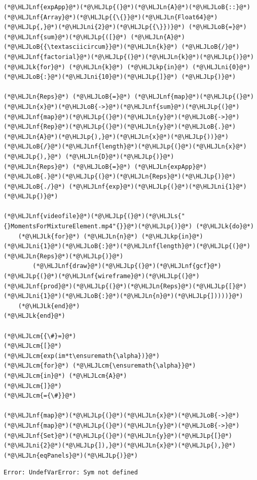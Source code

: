 \documentclass[12pt,a4paper]{article}
\newcommand{\HLJLk}[1]{\textcolor[RGB]{148,91,176}{\textbf{#1}}}
\newcommand{\HLJLkp}[1]{\textcolor[RGB]{148,91,176}{\textbf{#1}}}
\newcommand{\HLJLn}[1]{#1}
\newcommand{\HLJLnf}[1]{\textcolor[RGB]{66,102,213}{#1}}
\newcommand{\HLJLs}[1]{\textcolor[RGB]{201,61,57}{#1}}
\newcommand{\HLJLni}[1]{\textcolor[RGB]{59,151,46}{#1}}
\newcommand{\HLJLoB}[1]{\textcolor[RGB]{102,102,102}{\textbf{#1}}}
\newcommand{\HLJLp}[1]{#1}
\newcommand{\HLJLcm}[1]{\textcolor[RGB]{153,153,119}{\textit{#1}}}
\begin{document}
\begin{lstlisting}
(*@\HLJLnf{expApp}@*)(*@\HLJLp{(}@*)(*@\HLJLn{A}@*)(*@\HLJLoB{::}@*)(*@\HLJLnf{Array}@*)(*@\HLJLp{{\{}}@*)(*@\HLJLn{Float64}@*)(*@\HLJLp{,}@*)(*@\HLJLni{2}@*)(*@\HLJLp{{\}})}@*) (*@\HLJLoB{=}@*) (*@\HLJLnf{sum}@*)(*@\HLJLp{([}@*) (*@\HLJLn{A}@*)(*@\HLJLoB{{\textasciicircum}}@*)(*@\HLJLn{k}@*) (*@\HLJLoB{/}@*) (*@\HLJLnf{factorial}@*)(*@\HLJLp{(}@*)(*@\HLJLn{k}@*)(*@\HLJLp{)}@*) (*@\HLJLk{for}@*) (*@\HLJLn{k}@*) (*@\HLJLkp{in}@*) (*@\HLJLni{0}@*)(*@\HLJLoB{:}@*)(*@\HLJLni{10}@*)(*@\HLJLp{]}@*) (*@\HLJLp{)}@*)

(*@\HLJLn{Reps}@*) (*@\HLJLoB{=}@*) (*@\HLJLnf{map}@*)(*@\HLJLp{(}@*)(*@\HLJLn{x}@*)(*@\HLJLoB{->}@*)(*@\HLJLnf{sum}@*)(*@\HLJLp{(}@*)(*@\HLJLnf{map}@*)(*@\HLJLp{(}@*)(*@\HLJLn{y}@*)(*@\HLJLoB{->}@*)(*@\HLJLnf{Rep}@*)(*@\HLJLp{(}@*)(*@\HLJLn{y}@*)(*@\HLJLoB{.}@*)(*@\HLJLn{A}@*)(*@\HLJLp{),}@*)(*@\HLJLn{x}@*)(*@\HLJLp{))}@*)(*@\HLJLoB{/}@*)(*@\HLJLnf{length}@*)(*@\HLJLp{(}@*)(*@\HLJLn{x}@*)(*@\HLJLp{),}@*) (*@\HLJLn{D}@*)(*@\HLJLp{)}@*)
(*@\HLJLn{Reps}@*) (*@\HLJLoB{=}@*) (*@\HLJLn{expApp}@*)(*@\HLJLoB{.}@*)(*@\HLJLp{(}@*)(*@\HLJLn{Reps}@*)(*@\HLJLp{)}@*) (*@\HLJLoB{./}@*) (*@\HLJLnf{exp}@*)(*@\HLJLp{(}@*)(*@\HLJLni{1}@*)(*@\HLJLp{)}@*)

(*@\HLJLnf{videofile}@*)(*@\HLJLp{(}@*)(*@\HLJLs{"{}MomentsForMixtureElement.mp4"{}}@*)(*@\HLJLp{)}@*) (*@\HLJLk{do}@*)
	(*@\HLJLk{for}@*) (*@\HLJLn{n}@*) (*@\HLJLkp{in}@*) (*@\HLJLni{1}@*)(*@\HLJLoB{:}@*)(*@\HLJLnf{length}@*)(*@\HLJLp{(}@*)(*@\HLJLn{Reps}@*)(*@\HLJLp{)}@*)
		(*@\HLJLnf{draw}@*)(*@\HLJLp{(}@*)(*@\HLJLnf{gcf}@*)(*@\HLJLp{(}@*)(*@\HLJLnf{wireframe}@*)(*@\HLJLp{(}@*)(*@\HLJLnf{prod}@*)(*@\HLJLp{(}@*)(*@\HLJLn{Reps}@*)(*@\HLJLp{[}@*)(*@\HLJLni{1}@*)(*@\HLJLoB{:}@*)(*@\HLJLn{n}@*)(*@\HLJLp{]))))}@*)
	(*@\HLJLk{end}@*)
(*@\HLJLk{end}@*)

(*@\HLJLcm{{\#}=}@*)
(*@\HLJLcm{[}@*)
(*@\HLJLcm{exp(im*t\ensuremath{\alpha})}@*)
(*@\HLJLcm{for}@*) (*@\HLJLcm{\ensuremath{\alpha}}@*) (*@\HLJLcm{in}@*) (*@\HLJLcm{A}@*)
(*@\HLJLcm{]}@*)
(*@\HLJLcm{={\#}}@*)

(*@\HLJLnf{map}@*)(*@\HLJLp{(}@*)(*@\HLJLn{x}@*)(*@\HLJLoB{->}@*) (*@\HLJLnf{map}@*)(*@\HLJLp{(}@*)(*@\HLJLn{y}@*)(*@\HLJLoB{->}@*)(*@\HLJLnf{Set}@*)(*@\HLJLp{(}@*)(*@\HLJLn{y}@*)(*@\HLJLp{[}@*)(*@\HLJLni{2}@*)(*@\HLJLp{]),}@*)(*@\HLJLn{x}@*)(*@\HLJLp{),}@*)(*@\HLJLn{eqPanels}@*)(*@\HLJLp{)}@*)
\end{lstlisting}

\begin{lstlisting}
Error: UndefVarError: Sym not defined
\end{lstlisting}
\end{document}
